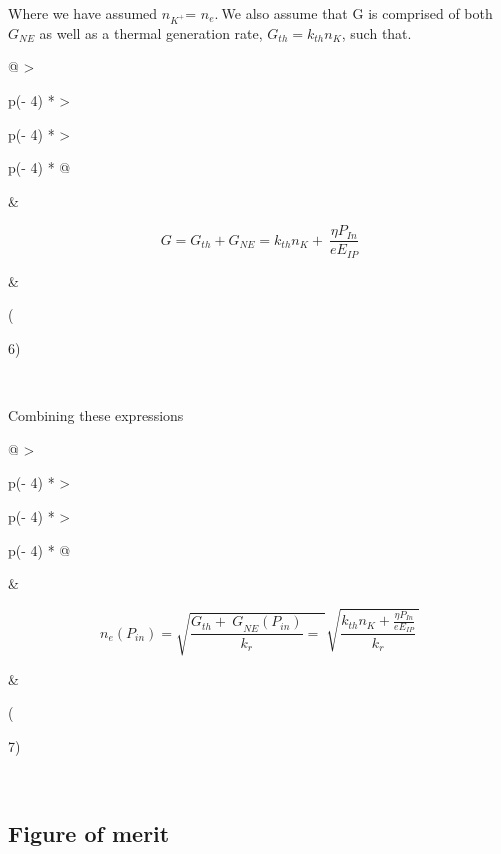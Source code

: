 Where we have assumed \(n_{K^{+}}\)= \(n_{e}.\ \)We also assume that G is comprised of both \(G_{NE}\) as well as a thermal generation rate, \(G_{th} = k_{th}n_{K}\), such that.

\begin{longtable}[]{@{}
  >{\raggedright\arraybackslash}p{(\columnwidth - 4\tabcolsep) * }
  >{\raggedright\arraybackslash}p{(\columnwidth - 4\tabcolsep) * }
  >{\raggedright\arraybackslash}p{(\columnwidth - 4\tabcolsep) * }@{}}
\toprule
\begin{minipage}[b]{\linewidth}\raggedright
\end{minipage} & \begin{minipage}[b]{\linewidth}\raggedright
\[G = G_{th} + G_{NE} = k_{th}n_{K} + \ \frac{\eta P_{In}}{eE_{IP}}\]
\end{minipage} & \begin{minipage}[b]{\linewidth}\raggedright
(

6)
\end{minipage} \\
\midrule
\endhead
\bottomrule
\end{longtable}

Combining these expressions

\begin{longtable}[]{@{}
  >{\raggedright\arraybackslash}p{(\columnwidth - 4\tabcolsep) * }
  >{\raggedright\arraybackslash}p{(\columnwidth - 4\tabcolsep) * }
  >{\raggedright\arraybackslash}p{(\columnwidth - 4\tabcolsep) * }@{}}
\toprule
\begin{minipage}[b]{\linewidth}\raggedright
\end{minipage} & \begin{minipage}[b]{\linewidth}\raggedright
\[n_{e}(P_{in}) = \sqrt{\frac{{G_{th} + \ G}_{NE}(P_{in})}{k_{r}} = \ }\sqrt{\frac{k_{th}n_{K} + \frac{\eta P_{In}}{eE_{IP}}}{k_{r}}\ }\]
\end{minipage} & \begin{minipage}[b]{\linewidth}\raggedright
(

7)
\end{minipage} \\
\midrule
\endhead
\bottomrule
\end{longtable}

\hypertarget{figure-of-merit}{%
\subsection{Figure of merit}\label{figure-of-merit}}

